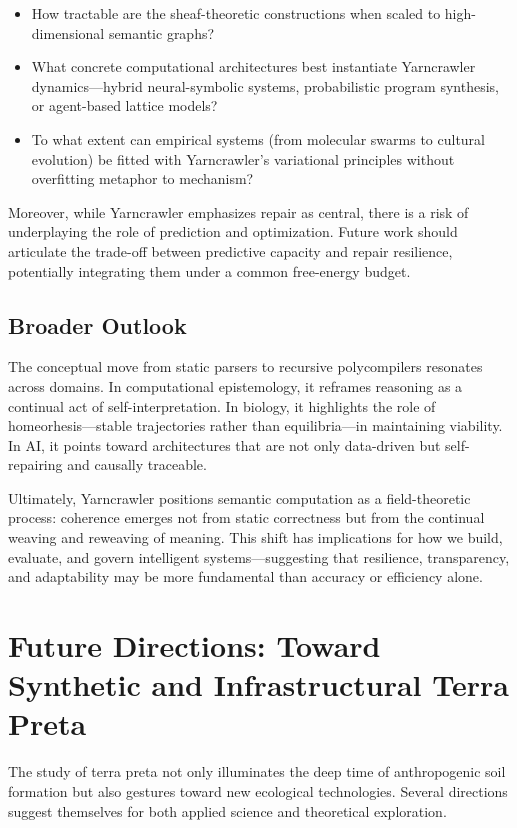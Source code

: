 \documentclass{article}
\begin{document}
\begin{itemize}
    \item How tractable are the sheaf-theoretic constructions when scaled to high-dimensional semantic graphs?
    \item What concrete computational architectures best instantiate Yarncrawler dynamics—hybrid neural-symbolic systems, probabilistic program synthesis, or agent-based lattice models?
    \item To what extent can empirical systems (from molecular swarms to cultural evolution) be fitted with Yarncrawler’s variational principles without overfitting metaphor to mechanism?
\end{itemize}

Moreover, while Yarncrawler emphasizes repair as central, there is a risk of underplaying the role of prediction and optimization. Future work should articulate the trade-off between predictive capacity and repair resilience, potentially integrating them under a common free-energy budget.

\subsection{Broader Outlook}
The conceptual move from static parsers to recursive polycompilers resonates across domains. In computational epistemology, it reframes reasoning as a continual act of self-interpretation. In biology, it highlights the role of homeorhesis—stable trajectories rather than equilibria—in maintaining viability. In AI, it points toward architectures that are not only data-driven but self-repairing and causally traceable.

Ultimately, Yarncrawler positions semantic computation as a field-theoretic process: coherence emerges not from static correctness but from the continual weaving and reweaving of meaning. This shift has implications for how we build, evaluate, and govern intelligent systems—suggesting that resilience, transparency, and adaptability may be more fundamental than accuracy or efficiency alone.

\section{Future Directions: Toward Synthetic and Infrastructural Terra Preta}

The study of terra preta not only illuminates the deep time of anthropogenic soil formation but also gestures toward new ecological technologies. Several directions suggest themselves for both applied science and theoretical exploration.
\end{document}

